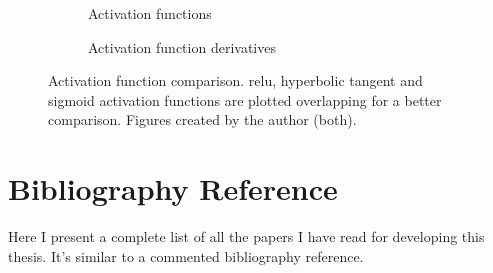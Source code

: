 \begin{figure}[p]
  \centering
  \begin{subfigure}[b]{.475\textwidth}
    \centering
    \caption{Activation functions}
  \end{subfigure}\hfill
  \begin{subfigure}[b]{.475\textwidth}
    \centering
    \caption{Activation function derivatives}
  \end{subfigure}
  \caption[Activation function comparison]{Activation function
    comparison. \Acf{relu}, hyperbolic tangent and sigmoid activation functions
    are plotted overlapping for a better comparison. Figures created by the
    author (both).}%
  \label{fig:activation-functions}
\end{figure}



\section{Bibliography Reference}


Here I present a complete list of all the papers I have read for developing
this thesis. It's similar to a commented bibliography reference.
